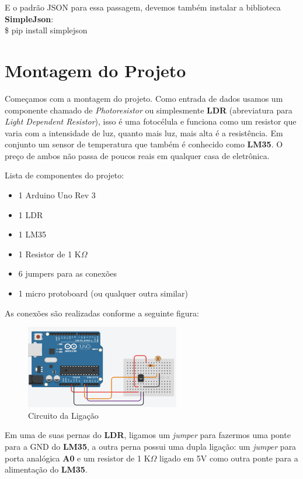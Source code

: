 \documentclass[a4paper,11pt]{article}
\begin{document}
E o padrão JSON para essa passagem, devemos também instalar a biblioteca \textbf{SimpleJson}: \\
{\ttfamily\$ pip install simplejson}

\section*{Montagem do Projeto}
Começamos com a montagem do projeto. Como entrada de dados usamos um componente chamado de \textit{Photoresistor} ou simplesmente \textbf{LDR} (abreviatura para \textit{Light Dependent Resistor}), isso é uma fotocélula e funciona como um resistor que varia com a intensidade de luz, quanto mais luz, mais alta é a resistência. Em conjunto um sensor de temperatura que também é conhecido como \textbf{LM35}. O preço de ambos não passa de poucos reais em qualquer casa de eletrônica.

Lista de componentes do projeto:
\begin{itemize}[nolistsep]
	\item 1 Arduino Uno Rev 3
	\item 1 LDR
	\item 1 LM35
	\item 1 Resistor de 1 K$\Omega$
	\item 6 jumpers para as conexões
	\item 1 micro protoboard (ou qualquer outra similar)
\end{itemize}

As conexões são realizadas conforme a seguinte figura:
\begin{figure}[H]
	\centering
	\includegraphics[width=0.60\textwidth]{images/circuito}
	\caption{Circuito da Ligação}
\end{figure}

Em uma de suas pernas do \textbf{LDR}, ligamos um \textit{jumper} para fazermos uma ponte para a GND do \textbf{LM35}, a outra perna possui uma dupla ligação: um \textit{jumper} para porta analógica \textbf{A0} e um resistor de 1 K$\Omega$ ligado em 5V como outra ponte para a alimentação do \textbf{LM35}. 
\end{document}
